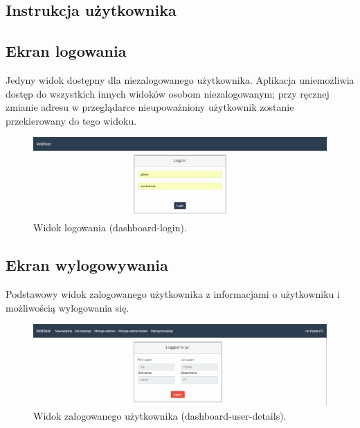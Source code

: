 \documentclass[eng,printmode,openany]{mgr}
\begin{document}
	
	
	\newpage 
	
	\begin{appendices}
		
		\chapter{Instrukcja użytkownika}
		\section{Ekran logowania}
		Jedyny widok dostępny dla niezalogowanego użytkownika. Aplikacja uniemożliwia dostęp do wszystkich innych widoków osobom niezalogowanym; przy ręcznej zmianie adresu w przeglądarce nieupoważniony użytkownik zostanie przekierowany do tego widoku.
		\begin{figure}[H]
			\centering
			\includegraphics[width=\textwidth]{images/views/dashboard-login.png}
			\caption{Widok logowania (dashboard-login).} 		
		\end{figure}
		
		\section{Ekran wylogowywania}
		Podstawowy widok zalogowanego użytkownika z informacjami o użytkowniku i możliwością wylogowania się.
		\begin{figure}[H]
			\centering
			\includegraphics[width=\textwidth]{images/views/dashboard-logout.png}
			\caption{Widok zalogowanego użytkownika (dashboard-user-details).} 
		\end{figure}
		

\end{appendices}
\end{document}
